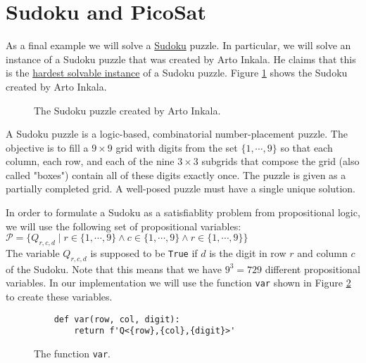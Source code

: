 \pagebreak

\section{Sudoku and PicoSat}
As a final example we will solve a \href{https://en.wikipedia.org/wiki/Sudoku}{Sudoku} puzzle.  In particular,
we will solve an instance of a Sudoku puzzle that was created by Arto Inkala.  He claims that this is the
\href{https://abcnews.go.com/blogs/headlines/2012/06/can-you-solve-the-hardest-ever-sudoku}{hardest solvable instance}
of a Sudoku puzzle.  Figure \ref{fig:sudoku.png} shows the Sudoku created by Arto Inkala.

\begin{figure}[!ht]
  \centering
  \caption{The Sudoku puzzle created by Arto Inkala.}
  \label{fig:sudoku.png}
\end{figure}

A Sudoku puzzle is a logic-based, combinatorial number-placement puzzle. The objective is to fill a
$9 \times 9$ grid with digits from the set $\{1, \cdots, 9\}$ so that each column, each row, and each of the
nine $3 \times 3$ subgrids that compose the grid (also called "boxes") contain all of these digits exactly
once.  The puzzle is given as a partially completed grid.  A well-posed puzzle must have a single unique
solution.

In order to formulate a Sudoku as a satisfiablity problem from propositional logic, we will use the following
set of propositional variables:
\\[0.2cm]
\hspace*{1.3cm}
$\mathcal{P} = \bigl\{ Q_{r,c,d} \mid r \in \{1,\cdots, 9\} \wedge c \in \{1,\cdots, 9\} \wedge r \in \{1,\cdots, 9\} \bigl\}$
\\[0.2cm]
The variable $Q_{r,c,d}$ is supposed to be \texttt{True} if $d$ is the digit in row $r$ and column $c$ of the
Sudoku.  Note that this means that we have $9^3 = 729$ different propositional variables.  In our
implementation we will use the function \texttt{var} shown in Figure \ref{fig:sudoku-var} to create these variables.

\begin{figure}[!ht]
\centering
\begin{verbatim}
    def var(row, col, digit):
        return f'Q<{row},{col},{digit}>'
\end{verbatim}
\vspace*{-0.3cm}
\caption{The function \texttt{var}.}
\label{fig:sudoku-var}
\end{figure}

